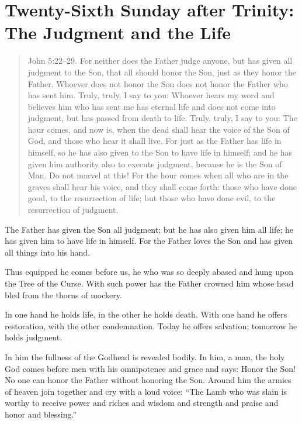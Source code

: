 
\section{Twenty-Sixth Sunday after Trinity: The Judgment and the Life}

\begin{quote}

John 5:22–29. For neither does the Father judge anyone, but has given all judgment to the Son, that all should honor the Son, just as they honor the Father. Whoever does not honor the Son does not honor the Father who has sent him. Truly, truly, I say to you: Whoever hears my word and believes him who has sent me has eternal life and does not come into judgment, but has passed from death to life. Truly, truly, I say to you: The hour comes, and now is, when the dead shall hear the voice of the Son of God, and those who hear it shall live. For just as the Father has life in himself, so he has also given to the Son to have life in himself; and he has given him authority also to execute judgment, because he is the Son of Man. Do not marvel at this! For the hour comes when all who are in the graves shall hear his voice, and they shall come forth: those who have done good, to the resurrection of life; but those who have done evil, to the resurrection of judgment.

\end{quote}

\bigskip


The Father has given the Son all judgment; but he has also given him all life; he has given him to have life in himself. For the Father loves the Son and has given all things into his hand.

Thus equipped he comes before us, he who was so deeply abased and hung upon the Tree of the Curse. With such power has the Father crowned him whose head bled from the thorns of mockery.

In one hand he holds life, in the other he holds death. With one hand he offers restoration, with the other condemnation. Today he offers salvation; tomorrow he holds judgment.

In him the fullness of the Godhead is revealed bodily. In him, a man, the holy God comes before men with his omnipotence and grace and says: Honor the Son! No one can honor the Father without honoring the Son. Around him the armies of heaven join together and cry with a loud voice: “The Lamb who was slain is worthy to receive power and riches and wisdom and strength and praise and honor and blessing.”

